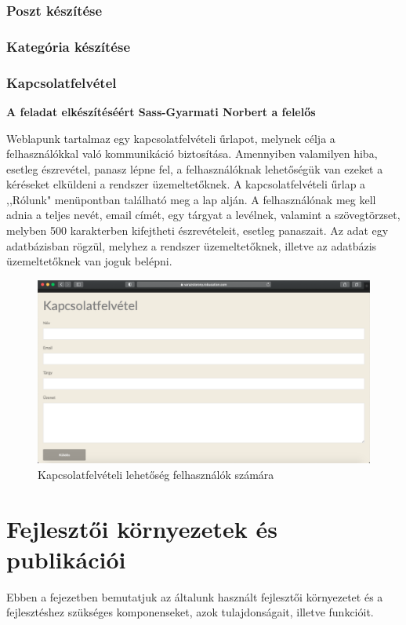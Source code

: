 \documentclass[
]{thesis-ekf}
\theoremstyle{definition}
\theoremstyle{remark}
\begin{document}
		\subsection{Poszt készítése}
		\subsection{Kategória készítése}
		\subsection{Kapcsolatfelvétel}
			\par \textbf{A feladat elkészítéséért Sass-Gyarmati Norbert a felelős}
			\par Weblapunk tartalmaz egy kapcsolatfelvételi űrlapot, melynek célja a felhasználókkal való kommunikáció biztosítása. Amennyiben valamilyen hiba, esetleg észrevétel, panasz lépne fel, a felhasználóknak lehetőségük van ezeket a kéréseket elküldeni a rendszer üzemeltetőknek. A kapcsolatfelvételi űrlap a ,,Rólunk" menüpontban található meg a lap alján. A felhasználónak meg kell adnia a teljes nevét, email címét, egy tárgyat a levélnek, valamint a szövegtörzset, melyben 500 karakterben kifejtheti észrevételeit, esetleg panaszait. Az adat egy adatbázisban rögzül, melyhez a rendszer üzemeltetőknek, illetve az adatbázis üzemeltetőknek van joguk belépni.
			\begin{figure}[ht]
				\centering
				\includegraphics[scale=0.30]{./images/contactme}
				\caption{Kapcsolatfelvételi lehetőség felhasználók számára}
				\label{fig:contactme}
			\end{figure}

\chapter{Fejlesztői környezetek és publikációi}
	\par Ebben a fejezetben bemutatjuk az általunk használt fejlesztői környezetet és a fejlesztéshez szükséges komponenseket, azok tulajdonságait, illetve funkcióit.
\end{document}
